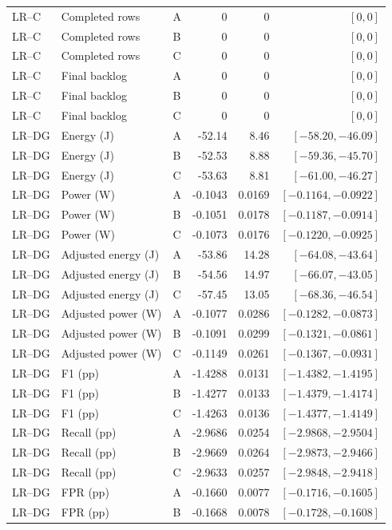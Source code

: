 \begin{longtable}{lllrrr}
LR--C & Completed rows & A & 0 & 0 & $[0,0]$\\
LR--C & Completed rows & B & 0 & 0 & $[0,0]$\\
LR--C & Completed rows & C & 0 & 0 & $[0,0]$\\
LR--C & Final backlog & A & 0 & 0 & $[0,0]$\\
LR--C & Final backlog & B & 0 & 0 & $[0,0]$\\
LR--C & Final backlog & C & 0 & 0 & $[0,0]$\\
LR--DG & Energy (J) & A & -52.14 & 8.46 & $[-58.20,-46.09]$\\
LR--DG & Energy (J) & B & -52.53 & 8.88 & $[-59.36,-45.70]$\\
LR--DG & Energy (J) & C & -53.63 & 8.81 & $[-61.00,-46.27]$\\
LR--DG & Power (W) & A & -0.1043 & 0.0169 & $[-0.1164,-0.0922]$\\
LR--DG & Power (W) & B & -0.1051 & 0.0178 & $[-0.1187,-0.0914]$\\
LR--DG & Power (W) & C & -0.1073 & 0.0176 & $[-0.1220,-0.0925]$\\
LR--DG & Adjusted energy (J) & A & -53.86 & 14.28 & $[-64.08,-43.64]$\\
LR--DG & Adjusted energy (J) & B & -54.56 & 14.97 & $[-66.07,-43.05]$\\
LR--DG & Adjusted energy (J) & C & -57.45 & 13.05 & $[-68.36,-46.54]$\\
LR--DG & Adjusted power (W) & A & -0.1077 & 0.0286 & $[-0.1282,-0.0873]$\\
LR--DG & Adjusted power (W) & B & -0.1091 & 0.0299 & $[-0.1321,-0.0861]$\\
LR--DG & Adjusted power (W) & C & -0.1149 & 0.0261 & $[-0.1367,-0.0931]$\\
LR--DG & F1 (pp) & A & -1.4288 & 0.0131 & $[-1.4382,-1.4195]$\\
LR--DG & F1 (pp) & B & -1.4277 & 0.0133 & $[-1.4379,-1.4174]$\\
LR--DG & F1 (pp) & C & -1.4263 & 0.0136 & $[-1.4377,-1.4149]$\\
LR--DG & Recall (pp) & A & -2.9686 & 0.0254 & $[-2.9868,-2.9504]$\\
LR--DG & Recall (pp) & B & -2.9669 & 0.0264 & $[-2.9873,-2.9466]$\\
LR--DG & Recall (pp) & C & -2.9633 & 0.0257 & $[-2.9848,-2.9418]$\\
LR--DG & FPR (pp) & A & -0.1660 & 0.0077 & $[-0.1716,-0.1605]$\\
LR--DG & FPR (pp) & B & -0.1668 & 0.0078 & $[-0.1728,-0.1608]$\\

\end{longtable}
